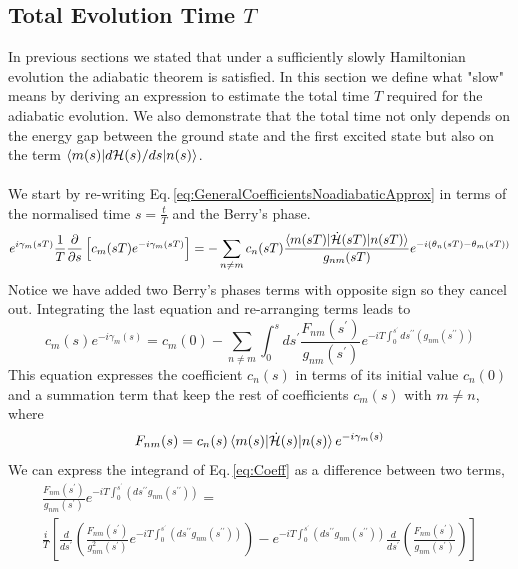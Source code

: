 \subsection{Total Evolution Time $T$}
In previous sections we stated that under a sufficiently slowly Hamiltonian evolution the adiabatic theorem is satisfied. In this section we define what "slow" means by deriving an expression to estimate the total time $T$ required for the adiabatic evolution. We also demonstrate that the total time not only depends on the energy gap between the ground state and the first excited state but also on the term $\braket{m(s)|d\mathcal{H}(s)/ds|n(s)}$.\\\\
We start by re-writing Eq.\,\eqref{eq:GeneralCoefficientsNoadiabaticApprox} in terms of the normalised time $s = \frac{t}{T}$ and the Berry's phase.
\begin{equation}
    e^{i\gamma_{m}(sT)}\frac{1}{T}\frac{\partial }{\partial s}\left[c_{m}(sT)e^{-i\gamma_{m}(sT)}\right] = -\sum_{n\neq m} c_{n}(sT) \frac{\braket{m(sT)|\dot{\mathcal{H}}(sT)|n(sT)}}{g_{nm}(sT)}e^{-i\left(\theta_{n}(sT) - \theta_{m}(sT)\right)}
\end{equation}
Notice we have added two Berry's phases terms with opposite sign so they cancel out. Integrating the last equation and re-arranging terms leads to
\begin{equation}
\label{eq:Coeff}
    c_{m}(s)e^{-i\gamma_{m}(s)} = c_{m}(0) - \sum_{n\neq m}\int_{0}^{s} ds^{\prime}\frac{F_{nm}(s^{\prime})}{g_{nm}(s^{\prime})}e^{-iT\int_{0}^{s^{\prime}}ds^{\prime\prime}\left(g_{nm}(s^{\prime\prime})\right)}
\end{equation}
This equation expresses the coefficient $c_{n}(s)$ in terms of its initial value $c_{n}(0)$ and a summation term that keep the rest of coefficients $c_{m}(s)$ with $m\neq n$, where
\begin{equation}
\label{eq:Fnm}
    F_{nm}(s) = c_{n}(s)\braket{m(s)|\dot{\mathcal{H}}(s)|n(s)} e^{-i\gamma_{m}(s)}
\end{equation}
We can express the integrand of Eq.\,\eqref{eq:Coeff} as a difference between two terms,
\begin{align}
\frac{F_{nm}(s^{\prime})}{g_{nm}(s^{\prime})} e^{-iT\int_{0}^{s^{\prime}}\left(ds^{\prime \prime}g_{nm}(s^{\prime\prime}) \right)}= \\
\frac{i}{T}\left[\frac{d}{ds^{\prime}}\left(\frac{F_{nm}(s^{\prime})}{g^{2}_{nm}(s^{\prime})}e^{-iT\int_{0}^{s^{\prime}}\left(ds^{\prime \prime}g_{nm}(s^{\prime\prime}) \right)}\right) - e^{-iT\int_{0}^{s^{\prime}}\left(ds^{\prime \prime}g_{nm}(s^{\prime\prime}) \right)} \frac{d}{ds^{\prime}}\left(\frac{F_{nm}(s^{\prime})}{g_{nm}(s^{\prime})}\right)\right] 
 \end{align}
